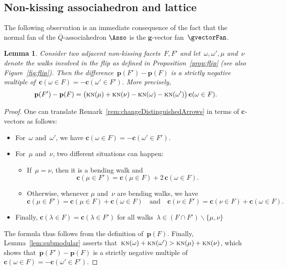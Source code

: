 \documentclass{memo-l}
\newtheorem{lemma}[theorem]{Lemma}
\theoremstyle{definition}
\renewcommand{\b}[1]{\mathbf{#1}} %
\newcommand{\ssm}{\smallsetminus} %
\newcommand{\fref}[1]{Figure~\ref{#1}} %
\newcommand{\KN}{\textsc{kn}} %
\newcommand{\cvector}[2]{\mathbf{c}(#1 \in #2)} %
\newcommand{\point}[1]{\mathbf{p}(#1)} %
\begin{document}
\subsection{Non-kissing associahedron and lattice}
\label{subsec:geomLattice}

\enlargethispage{-.1cm}
The following observation is an immediate consequence of the fact that the normal fan of the $\bar Q$-associahedron $\Asso$ is the $\b{g}$-vector fan~$\gvectorFan$.

\begin{lemma}
Consider two adjacent non-kissing facets~$F,F'$ and let~$\omega, \omega', \mu$ and~$\nu$ denote the walks involved in the flip as defined in Proposition~\ref{prop:flip} (see also \fref{fig:flip}).
Then the difference~${\point{F'} - \point{F}}$ is a strictly negative multiple of~$\cvector{\omega}{F} = -\cvector{\omega'}{F'}$.
More precisely,
\[
\point{F'} - \point{F} = \big( \KN(\mu) + \KN(\nu) - \KN(\omega) - \KN(\omega') \big) \, \cvector{\omega}{F}.
\]
\end{lemma}

\begin{proof}
One can translate Remark~\ref{rem:changeDistinguishedArrows} in terms of $\b{c}$-vectors as follows:
\begin{itemize}
\item For~$\omega$ and~$\omega'$, we have $\cvector{\omega}{F} = -\cvector{\omega'}{F'}$.
\item For~$\mu$ and~$\nu$, two different situations can happen:
\begin{itemize}
\item If~$\mu = \nu$, then it is a bending walk and~
\[
\cvector{\mu}{F'} = \cvector{\mu}{F} + 2\,\cvector{\omega}{F}.
\]
\item Otherwise, whenever $\mu$ and~$\nu$ are bending walks, we have
\[
\cvector{\mu}{F'} = \cvector{\mu}{F} + \cvector{\omega}{F}
\quad\text{and}\quad
\cvector{\nu}{F'} = \cvector{\nu}{F} + \cvector{\omega}{F}.
\]
\end{itemize}
\item Finally, $\cvector{\lambda}{F} = \cvector{\lambda}{F'}$ for all walks~$\lambda \in (F \cap F') \ssm \{\mu,\nu\}$
\end{itemize}
The formula thus follows from the definition of~$\point{F}$.
Finally, Lemma~\ref{lem:submodular} asserts that~${\KN(\omega) + \KN(\omega') > \KN(\mu) + \KN(\nu)}$, which shows that~${\point{F'} - \point{F}}$ is a strictly negative multiple of~$\cvector{\omega}{F} = -\cvector{\omega'}{F'}$.
\end{proof}
\end{document}
